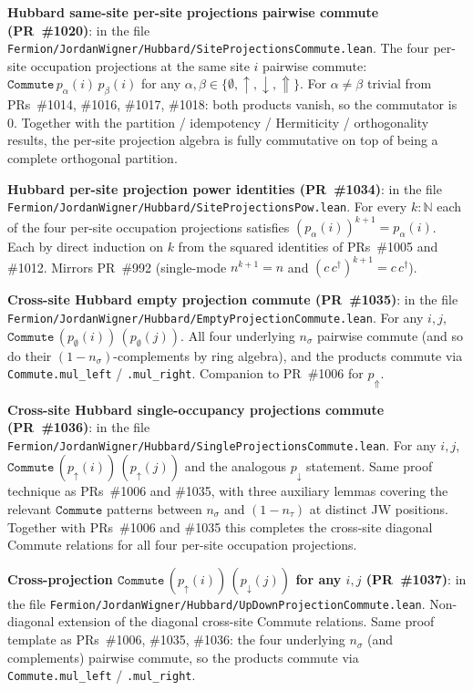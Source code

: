 \documentclass[a4paper,11pt]{article}
\begin{document}
\textbf{Hubbard same-site per-site projections pairwise commute
(PR~\#1020)}: in the file
\texttt{Fermion/JordanWigner/Hubbard/SiteProjectionsCommute.lean}.
The four per-site occupation projections at the same site $i$
pairwise commute: $\texttt{Commute}\,p_\alpha(i)\,p_\beta(i)$
for any $\alpha, \beta \in \{\emptyset, \uparrow, \downarrow,
\Uparrow\}$. For $\alpha \neq \beta$ trivial from
PRs~\#1014, \#1016, \#1017, \#1018: both products vanish, so
the commutator is $0$. Together with the partition / idempotency
/ Hermiticity / orthogonality results, the per-site projection
algebra is fully commutative on top of being a complete
orthogonal partition.

\textbf{Hubbard per-site projection power identities
(PR~\#1034)}: in the file
\texttt{Fermion/JordanWigner/Hubbard/SiteProjectionsPow.lean}.
For every $k : \mathbb{N}$ each of the four per-site occupation
projections satisfies $(p_\alpha(i))^{k+1} = p_\alpha(i)$.
Each by direct induction on $k$ from the squared identities of
PRs~\#1005 and \#1012. Mirrors PR~\#992 (single-mode
$n^{k+1} = n$ and $(c\,c^\dagger)^{k+1} = c\,c^\dagger$).

\textbf{Cross-site Hubbard empty projection commute (PR~\#1035)}:
in the file
\texttt{Fermion/JordanWigner/Hubbard/EmptyProjectionCommute.lean}.
For any $i, j$,
$\texttt{Commute}\,(p_\emptyset(i))\,(p_\emptyset(j))$. All four
underlying $n_\sigma$ pairwise commute (and so do their
$(1 - n_\sigma)$-complements by ring algebra), and the products
commute via \texttt{Commute.mul\_left} /
\texttt{.mul\_right}. Companion to PR~\#1006 for $p_\Uparrow$.

\textbf{Cross-site Hubbard single-occupancy projections commute
(PR~\#1036)}: in the file
\texttt{Fermion/JordanWigner/Hubbard/SingleProjectionsCommute.lean}.
For any $i, j$, $\texttt{Commute}\,(p_\uparrow(i))\,
(p_\uparrow(j))$ and the analogous $p_\downarrow$ statement.
Same proof technique as PRs~\#1006 and \#1035, with three
auxiliary lemmas covering the relevant
$\texttt{Commute}$ patterns between $n_\sigma$ and
$(1 - n_\tau)$ at distinct JW positions. Together with
PRs~\#1006 and \#1035 this completes the cross-site diagonal
Commute relations for all four per-site occupation projections.

\textbf{Cross-projection $\texttt{Commute}\,(p_\uparrow(i))\,
(p_\downarrow(j))$ for any $i, j$ (PR~\#1037)}: in the file
\texttt{Fermion/JordanWigner/Hubbard/UpDownProjectionCommute.lean}.
Non-diagonal extension of the diagonal cross-site Commute
relations. Same proof template as PRs~\#1006, \#1035, \#1036:
the four underlying $n_\sigma$ (and complements) pairwise
commute, so the products commute via \texttt{Commute.mul\_left}
/ \texttt{.mul\_right}.
\end{document}

